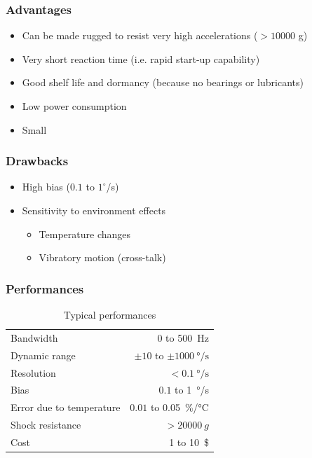 \documentclass[10pt]{beamer}
\begin{document}

\begin{frame}
\frametitle{Advantages}
    \begin{itemize}
        \item Can be made rugged to resist very high accelerations ($> 10000$ g)
        \item Very short reaction time (i.e. rapid start-up capability)
        \item Good shelf life and dormancy (because no bearings or lubricants)
        \item Low power consumption
        \item Small
    \end{itemize}
\end{frame}

\begin{frame}
\frametitle{Drawbacks}
    \begin{itemize}
        \item High bias ($0.1$ to $1^{\circ}$/s)
        \item Sensitivity to environment effects
        \begin{itemize}
            \item Temperature changes
            \item Vibratory motion (cross-talk)
        \end{itemize}
    \end{itemize}
\end{frame}

\begin{frame}
\frametitle{Performances}
    \begin{table}
    \begin{tabular}{lr}
        \toprule
        Bandwidth                   & 0 to \SI{500}{\hertz} \\
        Dynamic range               & $\pm 10$ to $\pm \SI{1000}{\degree/\second}$ \\
        Resolution                  & $< \SI{0.1}{\degree/\second}$ \\
        Bias                        & $0.1$ to \SI{1}{\degree/\second} \\
        Error due to temperature    & $0.01$ to \SI{0.05}{\%/\celsius} \\
        Shock resistance            & $> \SI{20000}{g}$ \\
        Cost                        & 1 to \SI{10}{\$} \\
        \bottomrule
    \end{tabular}
    \caption{Typical performances}
    \end{table}
\end{frame}
\end{document}
